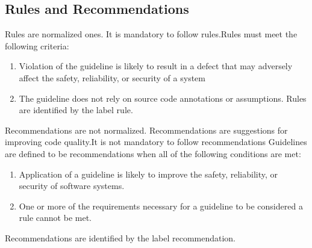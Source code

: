 \subsection{Rules and Recommendations}
Rules are normalized ones. It is mandatory to follow rules.Rules must meet the following criteria:
\begin{enumerate}
	
	\item Violation of the guideline is likely to result in a defect that may adversely affect the safety, reliability, or security of a system
	\item The guideline does not rely on source code annotations or assumptions.
	Rules are identified by the label rule.
\end{enumerate}
Recommendations are not normalized. Recommendations are suggestions for improving code quality.It is not mandatory to follow recommendations Guidelines are defined to be recommendations when all of the following conditions are met:
\begin{enumerate}
	
	\item Application of a guideline is likely to improve the safety, reliability, or security of software systems.
	\item One or more of the requirements necessary for a guideline to be considered a rule cannot be met.
\end{enumerate}	
Recommendations are identified by the label recommendation.


